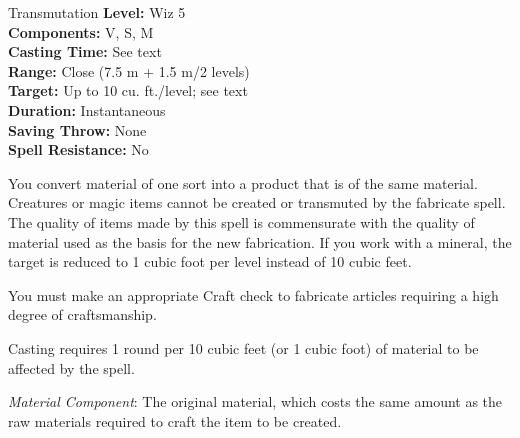 {Transmutation}
{
	\textbf{Level:}
	Wiz 5\\
	\textbf{Components:}
	V, S, M\\
	\textbf{Casting Time:}
	See text\\
	\textbf{Range:}
	Close (7.5 m + 1.5 m/2 levels)\\
	\textbf{Target:}
	Up to 10 cu. ft./level; see text\\
	\textbf{Duration:}
	Instantaneous\\
	\textbf{Saving Throw:}
	None\\
	\textbf{Spell Resistance:}
	No\\
}
{
	You convert material of one sort into a product that is of the same material. Creatures or magic items cannot be created or transmuted by the fabricate spell. The quality of items made by this spell is commensurate with the quality of material used as the basis for the new fabrication. If you work with a mineral, the target is reduced to 1 cubic foot per level instead of 10 cubic feet.

	You must make an appropriate Craft check to fabricate articles requiring a high degree of craftsmanship.

	Casting requires 1 round per 10 cubic feet (or 1 cubic foot) of material to be affected by the spell.

	\textit{Material Component}:
	The original material, which costs the same amount as the raw materials required to craft the item to be created.

}
